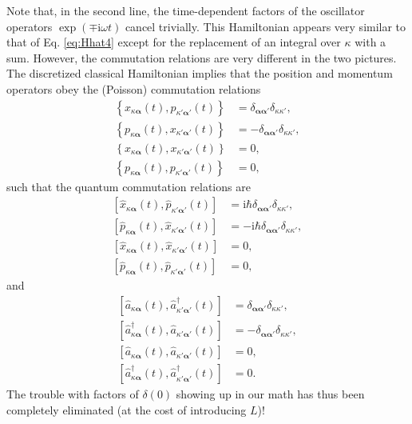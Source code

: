 \documentclass{article}
\numberwithin{equation}{section}
\begin{document}
Note that, in the second line, the time-dependent factors of the oscillator operators $\exp(\mp\mathrm{i}\omega t)$ cancel trivially. This Hamiltonian appears very similar to that of Eq. \eqref{eq:Hhat4} except for the replacement of an integral over $\kappa$ with a sum. However, the commutation relations are very different in the two pictures. The discretized classical Hamiltonian implies that the position and momentum operators obey the (Poisson) commutation relations
\begin{equation}
\begin{split}
\left\{x_{\kappa\bm{\alpha}}(t),p_{\kappa'\bm{\alpha}'}(t)\right\} &= \delta_{\bm{\alpha}\bm{\alpha}'}\delta_{\kappa\kappa'},\\
\left\{p_{\kappa\bm{\alpha}}(t),x_{\kappa'\bm{\alpha}'}(t)\right\} &= -\delta_{\bm{\alpha}\bm{\alpha}'}\delta_{\kappa\kappa'},\\
\left\{x_{\kappa\bm{\alpha}}(t),x_{\kappa'\bm{\alpha}'}(t)\right\} &= 0,\\
\left\{p_{\kappa\bm{\alpha}}(t),p_{\kappa'\bm{\alpha}'}(t)\right\} &= 0,
\end{split}
\end{equation}
such that the quantum commutation relations are
\begin{equation}
\begin{split}
\left[\hat{x}_{\kappa\bm{\alpha}}(t),\hat{p}_{\kappa'\bm{\alpha}'}(t)\right] &= \mathrm{i}\hbar\delta_{\bm{\alpha}\bm{\alpha}'}\delta_{\kappa\kappa'},\\
\left[\hat{p}_{\kappa\bm{\alpha}}(t),\hat{x}_{\kappa'\bm{\alpha}'}(t)\right] &= -\mathrm{i}\hbar\delta_{\bm{\alpha}\bm{\alpha}'}\delta_{\kappa\kappa'},\\
\left[\hat{x}_{\kappa\bm{\alpha}}(t),\hat{x}_{\kappa'\bm{\alpha}'}(t)\right] &= 0,\\
\left[\hat{p}_{\kappa\bm{\alpha}}(t),\hat{p}_{\kappa'\bm{\alpha}'}(t)\right] &= 0,
\end{split}
\end{equation}
and 
\begin{equation}
\begin{split}
\left[\hat{a}_{\kappa\bm{\alpha}}(t),\hat{a}_{\kappa'\bm{\alpha}'}^\dagger(t)\right] &= \delta_{\bm{\alpha}\bm{\alpha}'}\delta_{\kappa\kappa'},\\
\left[\hat{a}_{\kappa\bm{\alpha}}^\dagger(t),\hat{a}_{\kappa'\bm{\alpha}'}(t)\right] &= -\delta_{\bm{\alpha}\bm{\alpha}'}\delta_{\kappa\kappa'},\\
\left[\hat{a}_{\kappa\bm{\alpha}}(t),\hat{a}_{\kappa'\bm{\alpha}'}(t)\right] &= 0,\\
\left[\hat{a}_{\kappa\bm{\alpha}}^\dagger(t),\hat{a}_{\kappa'\bm{\alpha}'}^\dagger(t)\right] &= 0.
\end{split}
\end{equation}
The trouble with factors of $\delta(0)$ showing up in our math has thus been completely eliminated (at the cost of introducing $L$)! 
\end{document}
